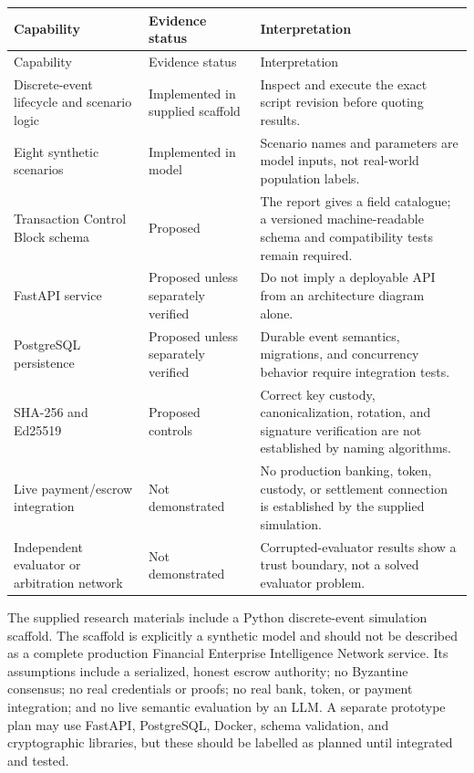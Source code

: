 \documentclass[12pt,a4paper,oneside]{report}
\begin{document}
\begin{longtable}{>{\raggedright\arraybackslash}p{}>{\raggedright\arraybackslash}p{}>{\raggedright\arraybackslash}p{}}
\toprule
Capability & Evidence status & Interpretation \\
\midrule
\endfirsthead
\toprule Capability & Evidence status & Interpretation \\
\midrule
\endhead
Discrete-event lifecycle and scenario logic & Implemented in supplied scaffold & Inspect and execute the exact script revision before quoting results. \\
Eight synthetic scenarios & Implemented in model & Scenario names and parameters are model inputs, not real-world population labels. \\
Transaction Control Block schema & Proposed & The report gives a field catalogue; a versioned machine-readable schema and compatibility tests remain required. \\
FastAPI service & Proposed unless separately verified & Do not imply a deployable API from an architecture diagram alone. \\
PostgreSQL persistence & Proposed unless separately verified & Durable event semantics, migrations, and concurrency behavior require integration tests. \\
SHA-256 and Ed25519 & Proposed controls & Correct key custody, canonicalization, rotation, and signature verification are not established by naming algorithms. \\
Live payment/escrow integration & Not demonstrated & No production banking, token, custody, or settlement connection is established by the supplied simulation. \\
Independent evaluator or arbitration network & Not demonstrated & Corrupted-evaluator results show a trust boundary, not a solved evaluator problem. \\
\bottomrule
\end{longtable}

The supplied research materials include a Python discrete-event simulation scaffold. The scaffold is explicitly a synthetic model and should not be described as a complete production Financial Enterprise Intelligence Network service. Its assumptions include a serialized, honest escrow authority; no Byzantine consensus; no real credentials or proofs; no real bank, token, or payment integration; and no live semantic evaluation by an LLM. A separate prototype plan may use FastAPI, PostgreSQL, Docker, schema validation, and cryptographic libraries, but these should be labelled as planned until integrated and tested.
\end{document}
